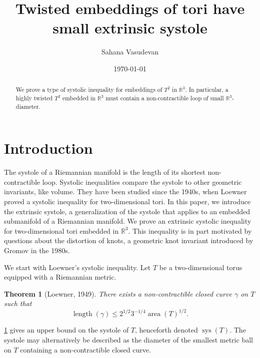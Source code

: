\documentclass[12pt]{amsart}
\makeatletter
\renewcommand{\email}[2][]{%
  \ifx\emails\@empty\relax\else{\g@addto@macro\emails{,\space}}\fi%
  \@ifnotempty{#1}{\g@addto@macro\emails{\textrm{(#1)}\space}}%
  \g@addto@macro\emails{#2}%
}
\DeclareMathOperator*{\Area}{area}
\DeclareMathOperator*{\length}{length}
\DeclareMathOperator*{\sys}{sys}
\newtheorem{theorem}{Theorem}[section]
\theoremstyle{definition}
\makeatother
\begin{document}
\title[Twisted Embeddings of Tori]{Twisted embeddings of tori have small extrinsic systole}
\date{\today}
\author[Vasudevan]{Sahana Vasudevan}
\address[Sahana Vasudevan]{School of Mathematics, Institute for Advanced Study, Princeton, NJ 08540, USA; Department of Mathematics, Princeton University, Princeton, NJ 08540, USA}
\email{sahanav@ias.edu}


\begin{abstract} We prove a type of systolic inequality for embeddings of $T^2$ in $\mathbb{R}^3$. In particular, a highly twisted $T^2$ embedded in $\mathbb{R}^3$ must contain a non-contractible loop of small $\mathbb{R}^3$-diameter. 
\end{abstract} 

\maketitle

\section{Introduction}

The systole of a Riemannian manifold is the length of its shortest non-contractible loop. Systolic inequalities compare the systole to other geometric invariants, like volume. They have been studied since the 1940s, when Loewner proved a systolic inequality for two-dimensional tori. In this paper, we introduce the extrinsic systole, a generalization of the systole that applies to an embedded submanifold of a Riemannian manifold. We prove an extrinsic systolic inequality for two-dimensional tori embedded in $\mathbb{R}^3$. This inequality is in part motivated by questions about the distortion of knots, a geometric knot invariant introduced by Gromov in the 1980s.

We start with Loewner's systolic inequality. Let $T$ be a two-dimensional torus equipped with a Riemannian metric. 

\begin{theorem}[Loewner, 1949] \label{Loewner's ineq} There exists a non-contractible closed curve $\gamma$ on $T$ such that $$\length(\gamma)\leq 2^{1/2}3^{-1/4}\Area(T)^{1/2}.$$
\end{theorem}

\cref{Loewner's ineq} gives an upper bound on the systole of $T$, henceforth denoted $\sys(T)$. The systole may alternatively be described as the diameter of the smallest metric ball on $T$ containing a non-contractible closed curve.
\end{document}
